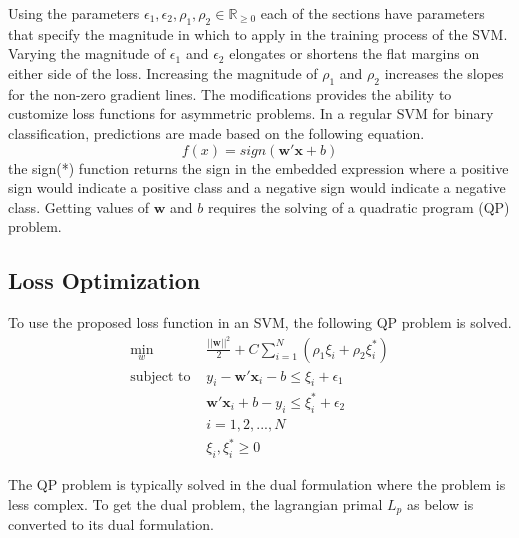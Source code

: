 \documentclass[twoside,11pt]{article}
\begin{document}
Using the parameters $\epsilon_1, \epsilon_2, \rho_1, \rho_2 \in\mathbb{R}_{\geq0}$ each of the sections have parameters that specify the magnitude in which to apply in the training process of the SVM. Varying the magnitude of $\epsilon_1$ and $\epsilon_2$ elongates or shortens the flat margins on either side of the loss. Increasing the magnitude of $\rho_1$ and $\rho_2$ increases the slopes for the non-zero gradient lines. The modifications provides the ability to customize loss functions for asymmetric problems. In a regular SVM for binary classification, predictions are made based on the following equation.
\begin{equation} \label{Eq:PredictionEqn}
f(x)=sign(\mathbf{w}'\mathbf{x}+b)
\end{equation}
the sign(*) function returns the sign in the embedded expression where a positive sign would indicate a positive class and a negative sign would indicate a negative class. Getting values of $\mathbf{w}$ and $b$ requires the solving of a quadratic program (QP) problem. 

\subsection{Loss Optimization}
To use the proposed loss function in an SVM, the following QP problem is solved.
\begin{equation} \label{Eq:QuantileSVMa}
\begin{array}{cc}
\displaystyle\min_w& \frac{||\mathbf{w}||^2}{2}+C\displaystyle\sum_{i=1}^N(\rho_1\xi_i + \rho_2\xi_i^*) \\
\text{subject to    } & y_i - \mathbf{w}'\mathbf{x}_i - b \leq \xi_i + \epsilon_1 \\
 & \mathbf{w}'\mathbf{x}_i + b -y_i \leq \xi_i^* + \epsilon_2 \\
&i=1,2,...,N\\
&\xi_i,\xi_i^* \geq 0
\end{array}
\end{equation}

The QP problem is typically solved in the dual formulation where the problem is less complex. To get the dual problem, the lagrangian primal $L_p$ as below is converted to its dual formulation.
\end{document}
